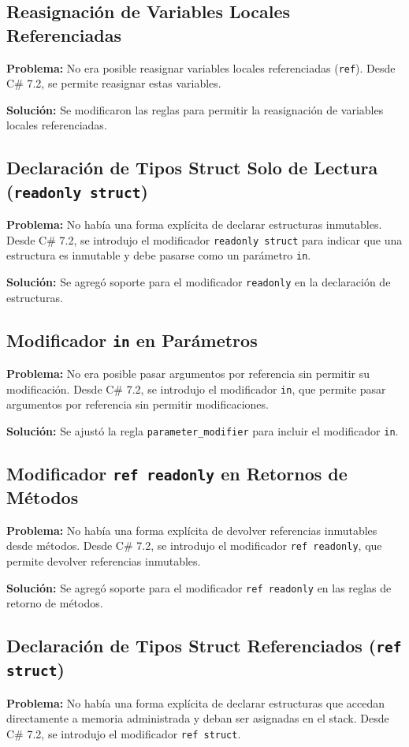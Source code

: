 \subsection*{Reasignación de Variables Locales Referenciadas}
\textbf{Problema:} No era posible reasignar variables locales referenciadas (\texttt{ref}). Desde C\# 7.2, se permite reasignar estas variables.

\textbf{Solución:} Se modificaron las reglas para permitir la reasignación de variables locales referenciadas.

\subsection*{Declaración de Tipos Struct Solo de Lectura (\texttt{readonly struct})}
\textbf{Problema:} No había una forma explícita de declarar estructuras inmutables. Desde C\# 7.2, se introdujo el modificador \texttt{readonly struct} para indicar que una estructura es inmutable y debe pasarse como un parámetro \texttt{in}.

\textbf{Solución:} Se agregó soporte para el modificador \texttt{readonly} en la declaración de estructuras.

\subsection*{Modificador \texttt{in} en Parámetros}
\textbf{Problema:} No era posible pasar argumentos por referencia sin permitir su modificación. Desde C\# 7.2, se introdujo el modificador \texttt{in}, que permite pasar argumentos por referencia sin permitir modificaciones.

\textbf{Solución:} Se ajustó la regla \texttt{parameter\_modifier} para incluir el modificador \texttt{in}.

\subsection*{Modificador \texttt{ref readonly} en Retornos de Métodos}
\textbf{Problema:} No había una forma explícita de devolver referencias inmutables desde métodos. Desde C\# 7.2, se introdujo el modificador \texttt{ref readonly}, que permite devolver referencias inmutables.

\textbf{Solución:} Se agregó soporte para el modificador \texttt{ref readonly} en las reglas de retorno de métodos.

\subsection*{Declaración de Tipos Struct Referenciados (\texttt{ref struct})}
\textbf{Problema:} No había una forma explícita de declarar estructuras que accedan directamente a memoria administrada y deban ser asignadas en el stack. Desde C\# 7.2, se introdujo el modificador \texttt{ref struct}.

